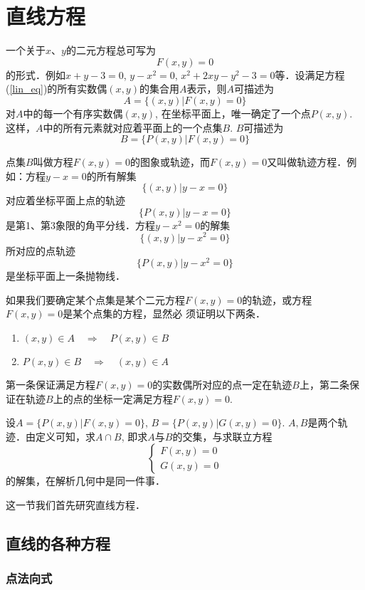 \section{直线方程}
一个关于$x$、$y$的二元方程总可写为
\begin{equation}\label{lin_eq}
 F (x,y) =0   
\end{equation}
的形式．例如$x+y-3=0$, $y-x^2=0$, $x^2+2xy-y^2-3=0$等．设满足方程(\ref{lin_eq})的所有实数偶$(x,y)$的集合用$A$表示，则$A$可描述为
\[A= \{ (x,y) |F (x,y) =0\} \]
对$A$中的每一个有序实数偶$(x,y)$, 在坐标平面上，唯一确定了一个点$P(x,y)$. 这样，$A$中的所有元素就对应着平面上的一个点集$B$. $B$可描述为
\[B= \{P (x,y) |F (x,y) =0\}\]

点集$B$叫做方程$F(x,y)=0$的图象或轨迹，而$F(x,y)=0$又叫做轨迹方程．例如：方程$y-x=0$的所有解集
\[\{ (x,y) |y-x=0\}\]
对应着坐标平面上点的轨迹
\[\{P (x,y) |y-x=0\} \]
是第1、第3象限的角平分线．方程$y-x^2=0$的解集
\[\{ (x,y) |y-x^2=0\}\]
所对应的点轨迹
\[\{P (x,y) |y-x^2=0\}\]
是坐标平面上一条抛物线．

如果我们要确定某个点集是某个二元方程$F(x,y)=0$的轨迹，或方程$F(x,y)=0$是某个点集的方程，显然必
须证明以下两条．
\begin{enumerate}
    \item $(x,y)\in A\quad \Rightarrow\quad P(x,y)\in B$
    \item $P (x,y) \in B\quad \Rightarrow\quad  (x,y) \in A$
\end{enumerate}
第一条保证满足方程$F(x,y)=0$的实数偶所对应的点一定在轨迹$B$上，第二条保证在轨迹$B$上的点的坐标一定满足方程$F(x,y)=0$.

设$A= \{P (x,y) |F (x,y) =0\}$, $B= \{P (x,y) |G (x,y) =0\}$. 
$A,B$是两个轨迹．由定义可知，求$A\cap B$, 即求$A$与$B$的交集，与求联立方程
\[\begin{cases}
   F (x,y) =0\\
   G (x,y) =0 
\end{cases}\]
的解集，在解析几何中是同一件事．

这一节我们首先研究直线方程．

\subsection{直线的各种方程}
\subsubsection{点法向式}

